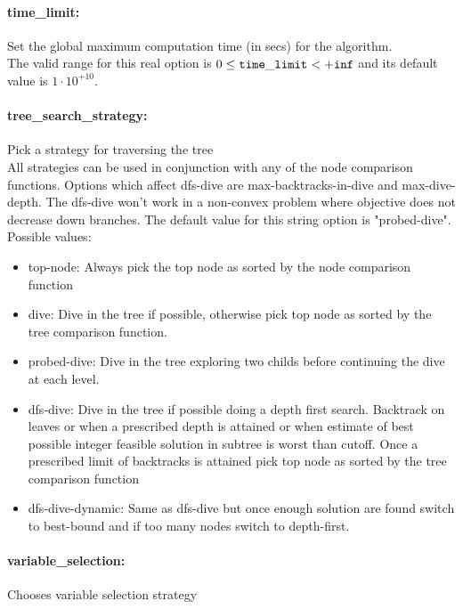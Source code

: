 \paragraph{time\_limit:}\label{sec:time_limit} Set the global maximum computation time (in secs) for the algorithm. $\;$ \\
 The valid range for this real option is 
$0 \le {\tt time\_limit } <  {\tt +inf}$
and its default value is $1 \cdot 10^{+10}$.


\paragraph{tree\_search\_strategy:}\label{sec:tree_search_strategy} Pick a strategy for traversing the tree $\;$ \\
 All strategies can be used in conjunction with
any of the node comparison functions. Options
which affect dfs-dive are max-backtracks-in-dive
and max-dive-depth. The dfs-dive won't work in a
non-convex problem where objective does not
decrease down branches.
The default value for this string option is "probed-dive".
\\ 
Possible values:
\begin{itemize}
   \item top-node:  Always pick the top node as sorted by the node
comparison function
   \item dive: Dive in the tree if possible, otherwise pick
top node as sorted by the tree comparison
function.
   \item probed-dive: Dive in the tree exploring two childs before
continuing the dive at each level.
   \item dfs-dive: Dive in the tree if possible doing a depth
first search. Backtrack on leaves or when a
prescribed depth is attained or when estimate
of best possible integer feasible solution in
subtree is worst than cutoff. Once a prescribed
limit of backtracks is attained pick top node
as sorted by the tree comparison function
   \item dfs-dive-dynamic: Same as dfs-dive but once enough solution are
found switch to best-bound and if too many
nodes switch to depth-first.
\end{itemize}

\paragraph{variable\_selection:}\label{sec:variable_selection} Chooses variable selection strategy $\;$ \\

